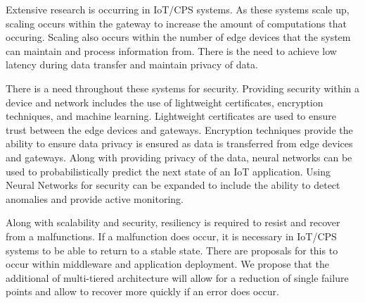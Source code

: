 \documentclass[../main.tex]{subfiles}
\begin{document}
Extensive research is occurring in IoT/CPS systems. As these systems scale up, scaling occurs within the gateway to increase the amount of computations that occuring. Scaling also occurs within the number of edge devices that the system can maintain and process information from. There is the need to achieve low latency during data transfer and maintain privacy of data. 

There is a need throughout these systems for security. Providing security within a device and network includes the use of lightweight certificates, encryption techniques, and machine learning. Lightweight certificates are used to ensure trust between the edge devices and gateways. Encryption techniques provide the ability to ensure data privacy is ensured as data is transferred from edge devices and gateways. Along with providing privacy of the data, neural networks can be used to probabilistically predict the next state of an IoT application. Using Neural Networks for security can be expanded to include the ability to detect anomalies and provide active monitoring. 

Along with scalability and security, resiliency is required to resist and recover from a malfunctions. If a malfunction does occur, it is necessary in IoT/CPS systems to be able to return to a stable state. There are proposals for this to occur within middleware and application deployment. We propose that the additional of multi-tiered architecture will allow for a reduction of single failure points and allow to recover more quickly if an error does occur.
\end{document}
